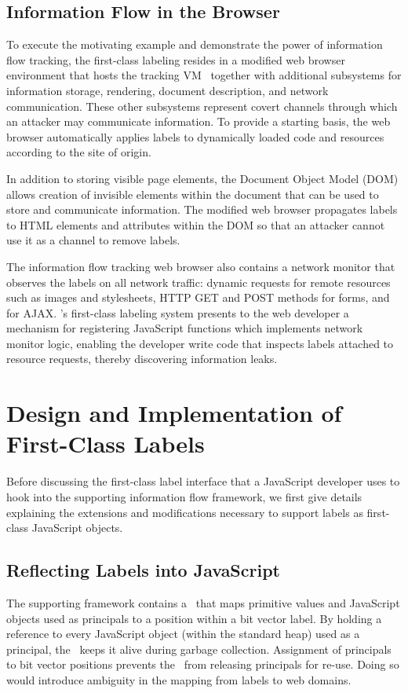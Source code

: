 \subsection{Information Flow in the Browser}

To execute the motivating example and demonstrate the power of information flow tracking, the first-class labeling resides in a modified web browser environment that hosts the tracking VM \FlowCore\ together with additional subsystems for information storage, rendering, document description, and network communication.
These other subsystems represent covert channels through which an attacker may communicate information.
To provide a starting basis, the web browser automatically applies labels to dynamically loaded code and resources according to the site of origin.

In addition to storing visible page elements, the Document Object Model (DOM) allows creation of invisible elements within the document that can be used to store and communicate information.
The modified web browser propagates labels to HTML elements and attributes within the DOM so that an attacker cannot use it as a channel to remove labels.

The information flow tracking web browser also contains a network monitor that observes the labels on all network traffic: dynamic requests for remote resources such as images and stylesheets, HTTP GET and POST methods for forms, and  for AJAX.
\FlowCore's first-class labeling system presents to the web developer a mechanism for registering JavaScript functions which implements network monitor logic, enabling the developer write code that inspects labels attached to resource requests, thereby discovering information leaks.

\section{Design and Implementation of First-Class Labels}
\label{sec:first-class-implementation}

Before discussing the first-class label interface that a JavaScript developer uses to hook into the supporting information flow framework, we first give details explaining the extensions and modifications necessary to support labels as first-class JavaScript objects.

\subsection{Reflecting Labels into JavaScript}
The supporting framework contains a \FlowLabelRegistry\ that maps primitive values and JavaScript objects used as principals to a position within a bit vector label.
By holding a reference to every JavaScript object (within the standard heap) used as a principal, the \FlowLabelRegistry\ keeps it alive during garbage collection.
Assignment of principals to bit vector positions prevents the \FlowLabelRegistry\ from releasing principals for re-use.
Doing so would introduce ambiguity in the mapping from labels to web domains.

